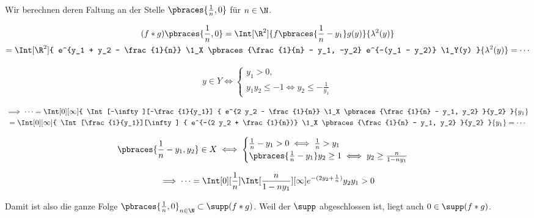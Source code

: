 \begin{solution}
Wir berechnen deren Faltung an der Stelle $\pbraces{\frac{1}{n}, 0}$ für $n \in \N$.

\begin{multline*}
    (f \ast g) \pbraces{\frac{1}{n}, 0}
    =
    \Int[\R^2]{f \pbraces{\frac{1}{n} - y_1} g(y)}{\lambda^2(y)} \\
    =
    \Int[\R^2]
    {
        e^{y_1 + y_2 - \frac{1}{n}}
        \1_X \pbraces{\frac{1}{n} - y_1, -y_2}
        e^{-(y_1 - y_2)}
        \1_Y(y)
    }{\lambda^2(y)}
    =
    \cdots
\end{multline*}

\begin{align*}
    y \in Y
    \iff
    \begin{cases}
        y_1 > 0, \\
        y_1 y_2 \leq -1 \iff y_2 \leq -\frac{1}{y_1}
    \end{cases}
\end{align*}

\begin{multline*}
    \implies
    \cdots
    =
    \Int[0][\infty]
    {
        \Int[-\infty][-\frac{1}{y_1}]
        {
            e^{2 y_2 - \frac{1}{n}}
            \1_X \pbraces{\frac{1}{n} - y_1, y_2}
        }{y_2}
    }{y_1} \\
    =
    \Int[0][\infty]
    {
        \Int[\frac{1}{y_1}][\infty]
        {
            e^{-(2 y_2 + \frac{1}{n})}
            \1_X \pbraces{\frac{1}{n} - y_1, y_2}
        }{y_2}
    }{y_1}
    =
    \cdots
\end{multline*}

\begin{align*}
    \pbraces{\frac{1}{n} - y_1, y_2} \in X
    \iff
    \begin{cases}
        \frac{1}{n} - y_1 > 0 \iff \frac{1}{n} > y_1 \\
        \pbraces{\frac{1}{n} - y_1} y_2 \geq 1 \iff y_2 \geq \frac{n}{1 - n y_1}
    \end{cases}
\end{align*}

\begin{align*}
    \implies
    \cdots
    =
    \Int[0][\frac{1}{n}]
    {
        \Int[\frac{n}{1 - n y_1}][\infty]
        {
            e^{-(2 y_2 + \frac{1}{n})}
        }{y_2}
    }{y_1}
    >
    0
\end{align*}

Damit ist also die ganze Folge $\pbraces{\frac{1}{n}, 0}_{n \in \N} \subset \supp(f \ast g)$.
Weil der $\supp$ abgeschlossen ist, liegt auch $0 \in \supp(f \ast g)$.


\end{solution}
